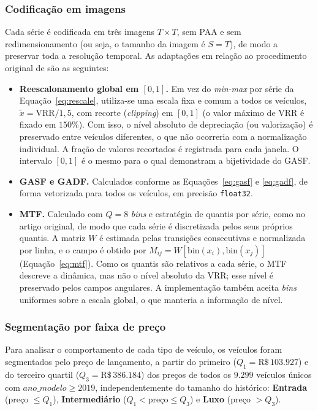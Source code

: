 \subsubsection{Codificação em imagens}

Cada série é codificada em três imagens $T \times T$, sem PAA e sem redimensionamento (ou seja, o tamanho da imagem é $S=T$), de modo a preservar toda a resolução temporal. As adaptações em relação ao procedimento original de \cite{wang2015imaging} são as seguintes:
\begin{itemize}
    \item \textbf{Reescalonamento global em $[0,1]$.} Em vez do \textit{min-max} por série da Equação~\ref{eq:rescale}, utiliza-se uma escala fixa e comum a todos os veículos, $\tilde{x} = \mathrm{VRR}/1{,}5$, com recorte (\textit{clipping}) em $[0,1]$ (o valor máximo de VRR é fixado em $150\%$). Com isso, o nível absoluto de depreciação (ou valorização) é preservado entre veículos diferentes, o que não ocorreria com a normalização individual. A fração de valores recortados é registrada para cada janela. O intervalo $[0,1]$ é o mesmo para o qual \cite{wang2015imaging} demonstram a bijetividade do GASF.
    \item \textbf{GASF e GADF.} Calculados conforme as Equações~\ref{eq:gasf} e \ref{eq:gadf}, de forma vetorizada para todos os veículos, em precisão \texttt{float32}.
    \item \textbf{MTF.} Calculado com $Q=8$ \textit{bins} e estratégia de quantis por série, como no artigo original, de modo que cada série é discretizada pelos seus próprios quantis. A matriz $W$ é estimada pelas transições consecutivas e normalizada por linha, e o campo é obtido por $M_{ij} = W[\mathrm{bin}(x_i), \mathrm{bin}(x_j)]$ (Equação~\ref{eq:mtf}). Como os quantis são relativos a cada série, o MTF descreve a dinâmica, mas não o nível absoluto da VRR; esse nível é preservado pelos campos angulares. A implementação também aceita \textit{bins} uniformes sobre a escala global, o que manteria a informação de nível.
\end{itemize}

\subsubsection{Segmentação por faixa de preço}

Para analisar o comportamento de cada tipo de veículo, os veículos foram segmentados pelo preço de lançamento, a partir do primeiro ($Q_1 = \text{R\$} \, 103.927$) e do terceiro quartil ($Q_3 = \text{R\$} \, 386.184$) dos preços de todos os $9.299$ veículos únicos com $\textit{ano\_modelo} \ge 2019$, independentemente do tamanho do histórico: \textbf{Entrada} (preço $\le Q_1$), \textbf{Intermediário} ($Q_1 < \text{preço} \le Q_3$) e \textbf{Luxo} (preço $> Q_3$).

